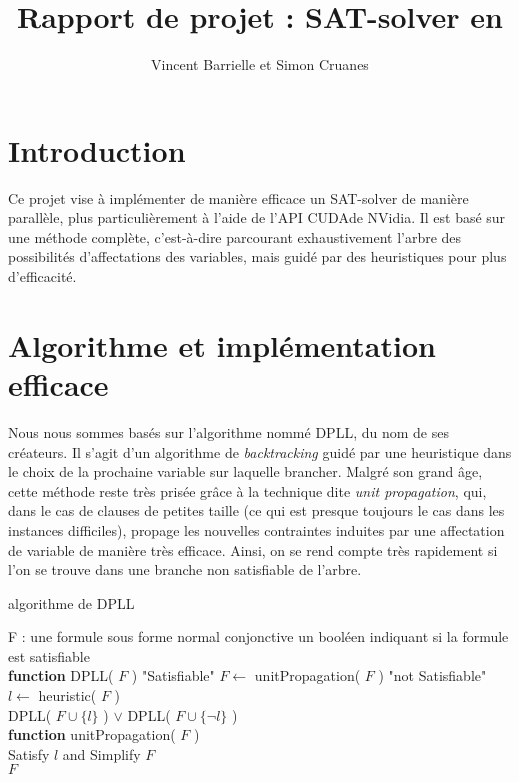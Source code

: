 \documentclass{article}
\author{Vincent Barrielle et Simon Cruanes}
\title{Rapport de projet : \textsc{SAT}-solver en \cuda}
\newcommand{\cuda}{\textsc{CUDA}}
\begin{document}
\maketitle
\tableofcontents%
\newpage

\section{Introduction}
Ce projet vise à implémenter de manière efficace un \textsc{SAT}-solver de manière parallèle, plus particulièrement à l'aide de l'\textsc{API} \cuda de NVidia. Il est basé sur une méthode complète, c'est-à-dire parcourant exhaustivement l'arbre des possibilités d'affectations des variables, mais guidé par des heuristiques pour plus d'efficacité.

\section{Algorithme et implémentation efficace}
Nous nous sommes basés sur l'algorithme nommé \textsc{DPLL}, du nom de ses créateurs. Il s'agit d'un algorithme de \emph{backtracking} guidé par une heuristique dans le choix de la prochaine variable sur laquelle brancher. Malgré son grand âge, cette méthode reste très prisée grâce à la technique dite \emph{unit propagation}, qui, dans le cas de clauses de petites taille (ce qui est presque toujours le cas dans les instances difficiles), propage les nouvelles contraintes induites par une affectation de variable de manière très efficace. Ainsi, on se rend compte très rapidement si l'on se trouve dans une branche non satisfiable de l'arbre.\par

\begin{algorithm}[h!]
\caption{algorithme de \textsc{DPLL}}\label{alg:DPLL}
\begin{algorithmic}
\REQUIRE F : une formule sous forme normal conjonctive
\ENSURE un booléen indiquant si la formule est satisfiable \\
\medskip
\textbf{function} DPLL( $F$ )
    \RETURN "Satisfiable"
  \ENDIF
  \STATE $F \gets$ unitPropagation( $F$ )
    \RETURN "not Satisfiable"
  \ENDIF
  \STATE $l \gets$ heuristic( $F$ ) \\
  \RETURN DPLL( $F \cup\{l\}$ ) $\vee$ DPLL( $F \cup \{\lnot l\}$ ) \\
\medskip
\textbf{function} unitPropagation( $F$ )\\
  Satisfy $l$ and Simplify $F$ \\
  \RETURN $F$
\ENDWHILE
\end{algorithmic}
\end{algorithm}
\end{document}
